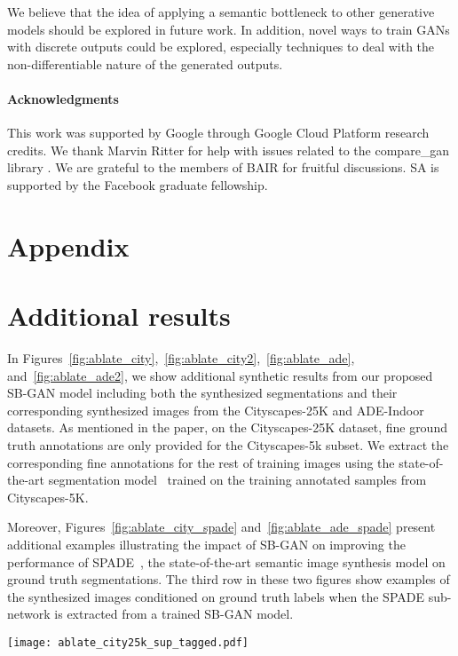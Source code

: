 \documentclass[10pt,twocolumn,letterpaper]{article}
\begin{document}
{We believe that the idea of applying a semantic bottleneck to other generative models should be explored in future work. In addition, novel ways to train GANs with discrete outputs could be explored, especially techniques to deal with the non-differentiable nature of the generated outputs.

\paragraph{Acknowledgments}
This work was supported by Google through Google Cloud Platform research credits. We thank Marvin Ritter for help with issues related to the compare\_gan library \cite{lucic2018}. We are grateful to the members of BAIR for fruitful discussions. SA is supported by the Facebook graduate fellowship. 


{\small


}

\newpage
\appendix
\section*{Appendix}
\section{Additional results}
In Figures~\ref{fig:ablate_city},~\ref{fig:ablate_city2},~\ref{fig:ablate_ade}, and~\ref{fig:ablate_ade2}, we show additional synthetic results from our proposed SB-GAN model including both the synthesized segmentations and their corresponding synthesized images from the Cityscapes-25K and ADE-Indoor datasets. As mentioned in the paper, on the Cityscapes-25K dataset, fine ground truth annotations are only provided for the Cityscapes-5k subset. We extract the corresponding fine annotations for the rest of training images using the state-of-the-art segmentation model~\cite{DRN, Yu2016} trained on the training annotated samples from Cityscapes-5K. 

Moreover, Figures~\ref{fig:ablate_city_spade} and~\ref{fig:ablate_ade_spade} present additional examples illustrating the impact of SB-GAN on improving the performance of SPADE~\cite{SPADE}, the state-of-the-art semantic image synthesis model on ground truth segmentations. The third row in these two figures show examples of the synthesized images conditioned on ground truth labels when the SPADE sub-network is extracted from a trained SB-GAN model.



\begin{figure*}[t!]
\centering
\texttt{[image: ablate\_city25k\_sup\_tagged.pdf]}
\caption{Segmentations and their corresponding images synthesized by SB-GAN trained on the Cityscapes-25K dataset.}
\label{fig:ablate_city}
\end{figure*}

}
\end{document}
